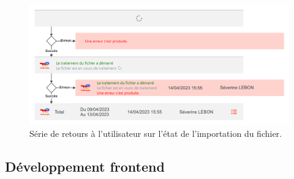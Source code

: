 \begin{figure}[ht]
    \centering
    \includegraphics[width=\textwidth]{img/feedbacks}
    \caption{Série de retours à l'utilisateur sur l'état de l'importation du fichier.}
    \label{fig:frontend-maquettage-feedbacks}
\end{figure}

\subsection{Développement frontend}

